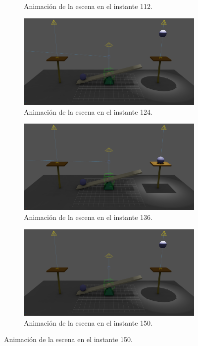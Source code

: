 \documentclass{article}
\begin{document}
\begin{figure}[H]
\begin{subfigure}[t]{0.48\textwidth}
    \caption{Animación de la escena en el instante 112.}
 \end{subfigure}
\hfill
 \begin{subfigure}[t]{0.48\textwidth}
    \centering
    \includegraphics[width=\textwidth]{imagenes/animaciones/general/124.png}
    \caption{Animación de la escena en el instante 124.}
 \end{subfigure}
\hfill
 \begin{subfigure}[t]{0.48\textwidth}
    \centering
    \includegraphics[width=\textwidth]{imagenes/animaciones/general/136.png}
    \caption{Animación de la escena en el instante 136.}
 \end{subfigure}
\hfill
 \begin{subfigure}[t]{0.48\textwidth}
    \centering
    \includegraphics[width=\textwidth]{imagenes/animaciones/general/150.png}
    \caption{Animación de la escena en el instante 150.}
 \end{subfigure}
\end{figure}
\end{document}
